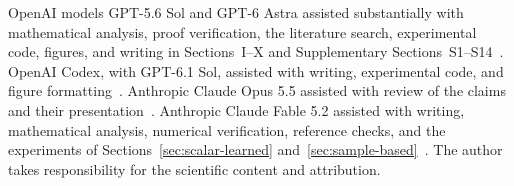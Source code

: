 OpenAI models GPT-5.6 Sol and GPT-6 Astra
assisted substantially with mathematical analysis, proof verification,
the literature search, experimental code, figures, and writing in
Sections~I--X and Supplementary Sections~S1--S14~\citep{openai_chatgpt,openai_codex}.
OpenAI Codex, with GPT-6.1 Sol, assisted with writing, experimental code,
and figure formatting~\citep{openai_codex}. Anthropic Claude Opus 5.5
assisted with review of the claims and their presentation~\citep{anthropic_claude}.
Anthropic Claude Fable 5.2 assisted with writing, mathematical analysis,
numerical verification, reference checks, and the experiments of
Sections~\ref{sec:scalar-learned} and~\ref{sec:sample-based}~\citep{anthropic_claude_fable}.
The author takes responsibility for the scientific content and attribution.

